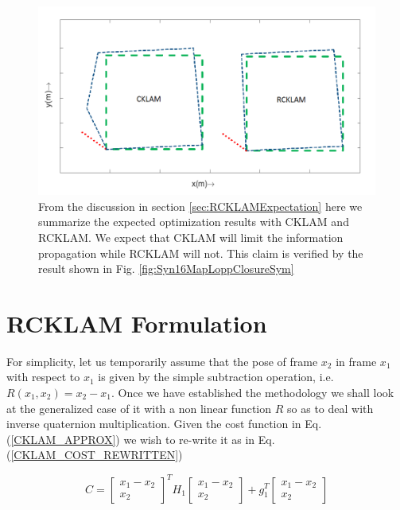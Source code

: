 \begin{figure}
	\centering
		\includegraphics[width=1.00\textwidth]{images/hypotheticalLoopClosureCklamRcklam.png}
  \caption{From the discussion in section \ref{sec:RCKLAMExpectation} here we summarize the expected optimization results with CKLAM and RCKLAM. We expect that CKLAM will limit the information propagation while RCKLAM will not. This claim is verified by the result shown in Fig. \ref{fig:Syn16MapLoppClosureSym}}
  \label{fig:hypotheticalLoopClosureCklamRcklam}
\end{figure}

 

\section{RCKLAM Formulation}
\label{sec:rcklamSimple}
For simplicity, let us temporarily assume that the pose of frame $x_2$ in frame $x_1$ with respect to $x_1$ is given by the simple  subtraction operation, i.e. $R(x_1, x_2) = x_2 - x_1$. Once we have established the methodology we shall look at the generalized case of it with a non linear function $R$ so as to deal with inverse quaternion multiplication. Given the cost function in Eq.(\ref{CKLAM_APPROX}) we wish to re-write it as in Eq.(\ref{CKLAM_COST_REWRITTEN})

\begin{equation}
	C = \begin{bmatrix} x_1-x_2 \\ x_2 \end{bmatrix} ^TH_1\begin{bmatrix} x_1-x_2 \\ x_2 \end{bmatrix} + g_1^T\begin{bmatrix} x_1-x_2 \\ x_2 \end{bmatrix}
	\label{CKLAM_COST_REWRITTEN}
\end{equation}

